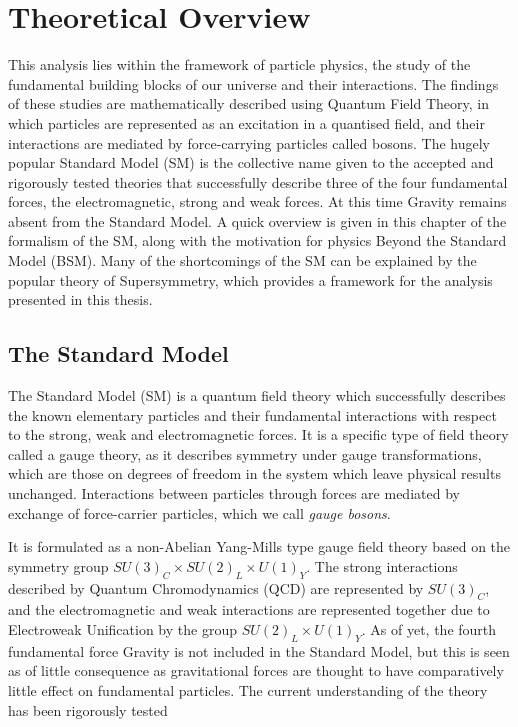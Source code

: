 \chapter{Theoretical Overview}

This analysis lies within the framework of particle physics, the study of the fundamental building blocks of our universe and their interactions. The findings of these studies are mathematically described using Quantum Field Theory, in which particles are represented as an excitation in a quantised field, and their interactions are mediated by force-carrying particles called bosons. The hugely popular Standard Model (SM) is the collective name given to the accepted and rigorously tested theories that successfully describe three of the four fundamental forces, the electromagnetic, strong and weak forces. At this time Gravity remains absent from the Standard Model. A quick overview is given in this chapter of the formalism of the SM, along with the motivation for physics Beyond the Standard Model (BSM).  Many of the shortcomings of the SM can be explained by the popular theory of Supersymmetry, which provides a framework for the analysis presented in this thesis. 


\section{The Standard Model}

The Standard Model (SM) is a quantum field theory which successfully describes the known elementary particles and their fundamental interactions with respect to the strong, weak and electromagnetic forces. It is a specific type of field theory called a gauge theory, as it describes symmetry under gauge transformations, which are those on degrees of freedom in the system which leave physical results unchanged. Interactions between particles through forces are mediated by exchange of force-carrier particles, which we call \textit{gauge bosons}. 

It is formulated as a non-Abelian Yang-Mills type gauge field theory based on the symmetry group $SU(3)_{C} \times SU(2)_{L} \times U(1)_{Y}$. The strong interactions described by Quantum Chromodynamics (QCD) are represented by $SU(3)_{C}$, and the electromagnetic and weak interactions are represented together due to Electroweak Unification by the group $SU(2)_L \times U(1)_{Y}$. As of yet, the fourth fundamental force Gravity is not included in the Standard Model, but this is seen as of little consequence as gravitational forces are thought to have comparatively little effect on fundamental particles. The current understanding of the theory has been rigorously tested  



